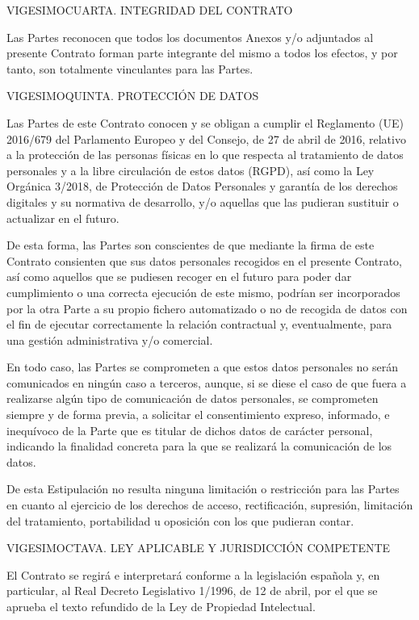 \documentclass[a4paper,11pt]{report}
\begin{document}
	VIGESIMOCUARTA. INTEGRIDAD DEL CONTRATO
	
	Las Partes reconocen que todos los documentos Anexos y/o adjuntados al
	presente Contrato forman parte integrante del mismo a todos los efectos,
	y por tanto, son totalmente vinculantes para las Partes.
	
	VIGESIMOQUINTA. PROTECCIÓN DE DATOS
	
	Las Partes de este Contrato conocen y se obligan a cumplir el Reglamento
	(UE) 2016/679 del Parlamento Europeo y del Consejo, de 27 de abril de
	2016, relativo a la protección de las personas físicas en lo que
	respecta al tratamiento de datos personales y a la libre circulación de
	estos datos (RGPD), así como la Ley Orgánica 3/2018, de Protección de
	Datos Personales y garantía de los derechos digitales y su normativa de
	desarrollo, y/o aquellas que las pudieran sustituir o actualizar en el
	futuro.
	
	De esta forma, las Partes son conscientes de que mediante la firma de
	este Contrato consienten que sus datos personales recogidos en el
	presente Contrato, así como aquellos que se pudiesen recoger en el
	futuro para poder dar cumplimiento o una correcta ejecución de este
	mismo, podrían ser incorporados por la otra Parte a su propio fichero
	automatizado o no de recogida de datos con el fin de ejecutar
	correctamente la relación contractual y, eventualmente, para una gestión
	administrativa y/o comercial.
	
	En todo caso, las Partes se comprometen a que estos datos personales no
	serán comunicados en ningún caso a terceros, aunque, si se diese el caso
	de que fuera a realizarse algún tipo de comunicación de datos
	personales, se comprometen siempre y de forma previa, a solicitar el
	consentimiento expreso, informado, e inequívoco de la Parte que es
	titular de dichos datos de carácter personal, indicando la finalidad
	concreta para la que se realizará la comunicación de los datos.
	
	De esta Estipulación no resulta ninguna limitación o restricción para
	las Partes en cuanto al ejercicio de los derechos de acceso,
	rectificación, supresión, limitación del tratamiento, portabilidad u
	oposición con los que pudieran contar.
	
	VIGESIMOCTAVA. LEY APLICABLE Y JURISDICCIÓN COMPETENTE
	
	El Contrato se regirá e interpretará conforme a la legislación española
	y, en particular, al Real Decreto Legislativo 1/1996, de 12 de abril,
	por el que se aprueba el texto refundido de la Ley de Propiedad
	Intelectual.
	
\end{document}
